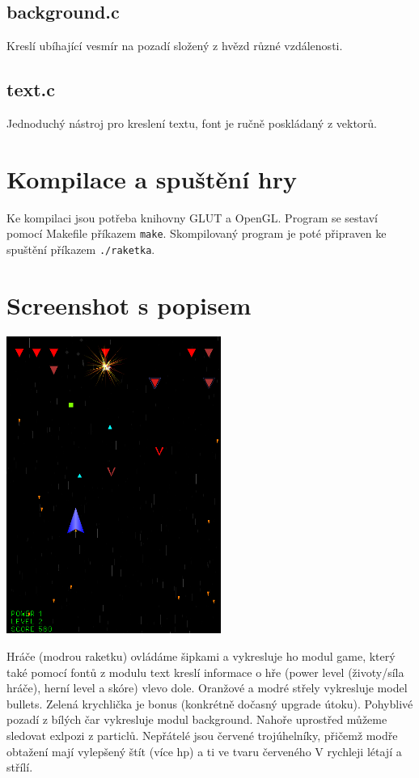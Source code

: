\documentclass{article}
\begin{document}
\subsection{background.c}
Kreslí ubíhající vesmír na pozadí složený z hvězd různé vzdálenosti.

\subsection{text.c}
Jednoduchý nástroj pro kreslení textu, font je ručně poskládaný z
vektorů.

\section{Kompilace a spuštění hry}

Ke kompilaci jsou potřeba knihovny GLUT a OpenGL. Program se sestaví pomocí
Makefile příkazem \texttt{make}. Skompilovaný program je poté připraven ke
spuštění příkazem \texttt{./raketka}.

\section{Screenshot s popisem}
\begin{center}
\includegraphics[width=7cm]{basic_hit.png}
\end{center}

Hráče (modrou raketku) ovládáme šipkami a vykresluje ho modul game, který také pomocí fontů z modulu text kreslí informace o hře (power level (životy/síla hráče), herní level a skóre) vlevo dole. Oranžové a modré střely vykresluje model bullets. Zelená krychlička je bonus (konkrétně dočasný upgrade útoku). Pohyblivé pozadí z bílých čar vykresluje modul background. Nahoře uprostřed můžeme sledovat exlpozi z particlů. Nepřátelé jsou červené trojúhelníky, přičemž modře obtažení mají vylepšený štít (více hp) a ti ve tvaru červeného V rychleji létají a střílí.
\end{document}
